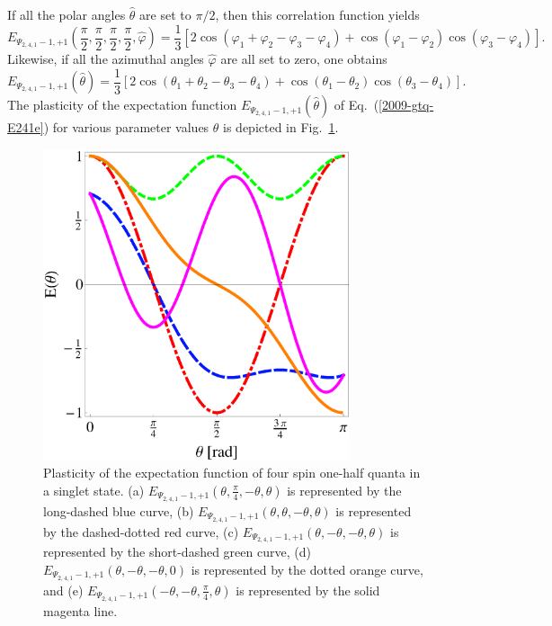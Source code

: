 \documentclass[pra,amsfonts,showpacs,showkeys,preprint]{revtex4}
\begin{document}
If all the polar angles $\hat \theta$ are set to $\pi /2$,
then this correlation function yields
\begin{equation}
E_{{\Psi_{2,4,1}}-1,+1} ( \frac{\pi}{2},\frac{\pi}{2},\frac{\pi}{2},\frac{\pi}{2},\hat \varphi )=
\frac{1}{3} \left[2 \cos (\varphi_1+\varphi_2- \varphi_3 - \varphi_4)
+\cos (\varphi_1-\varphi_2) \cos (\varphi_3-\varphi_4)
\right]
.
\end{equation}
Likewise, if all the azimuthal angles $\hat \varphi$ are all set to zero, one obtains
\begin{equation}
E_{{\Psi_{2,4,1}}-1,+1} (\hat \theta )=
\frac{1}{3} \left[2 \cos (\theta_1+\theta_2- \theta_3 - \theta_4)
+\cos (\theta_1-\theta_2) \cos (\theta_3-\theta_4)
\right]
.
\label{2009-gtq-E241e}
\end{equation}
The plasticity of the expectation function
$E_{{\Psi_{2,4,1}}-1,+1} (\hat \theta )$ of Eq.~(\ref{2009-gtq-E241e})
for various parameter values $\theta$ is depicted in Fig.~\ref{2009-gtq-E241}.
\begin{figure}[htbp]
  \centering
\includegraphics[width=90mm]{2009-gtq-E241}
\caption{Plasticity of the expectation function of four spin one-half quanta in a singlet state.
(a) $E_{{\Psi_{2,4,1}}-1,+1}(\theta , \frac{\pi}{4}, -\theta , \theta )$ is represented by the long-dashed blue curve,
(b) $E_{{\Psi_{2,4,1}}-1,+1}(\theta , \theta , -\theta , \theta )$ is represented by the dashed-dotted red curve,
(c) $E_{{\Psi_{2,4,1}}-1,+1}(\theta , -\theta , -\theta , \theta )$ is represented by the short-dashed green curve,
(d) $E_{{\Psi_{2,4,1}}-1,+1}(\theta , -\theta , -\theta , 0)$ is represented by the dotted orange curve,
and
(e) $E_{{\Psi_{2,4,1}}-1,+1}(-\theta , -\theta , \frac{\pi}{4}, \theta )$ is represented by the solid magenta line.
}
\label{2009-gtq-E241}
\end{figure}
\end{document}
